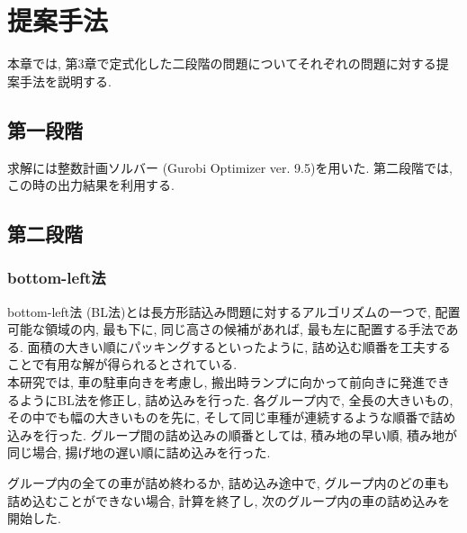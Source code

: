 \chapter{提案手法}\label{method}
本章では, 第3章で定式化した二段階の問題についてそれぞれの問題に対する提案手法を説明する. 

\section{第一段階}
求解には整数計画ソルバー (Gurobi Optimizer ver. 9.5)を用いた. 
第二段階では, この時の出力結果を利用する.  

\section{第二段階}
\subsection*{bottom-left法}
bottom-left法 (BL法)とは長方形詰込み問題に対するアルゴリズムの一つで, 配置可能な領域の内, 最も下に, 同じ高さの候補があれば, 最も左に配置する手法である\cite{nfp2}. 
面積の大きい順にパッキングするといったように, 詰め込む順番を工夫することで有用な解が得られるとされている. \\


本研究では, 車の駐車向きを考慮し, 搬出時ランプに向かって前向きに発進できるようにBL法を修正し, 詰め込みを行った. 
各グループ内で, 全長の大きいもの, その中でも幅の大きいものを先に, そして同じ車種が連続するような順番で詰め込みを行った. 
グループ間の詰め込みの順番としては, 積み地の早い順, 積み地が同じ場合, 揚げ地の遅い順に詰め込みを行った. 

グループ内の全ての車が詰め終わるか, 詰め込み途中で, グループ内のどの車も詰め込むことができない場合, 計算を終了し, 次のグループ内の車の詰め込みを開始した. 
